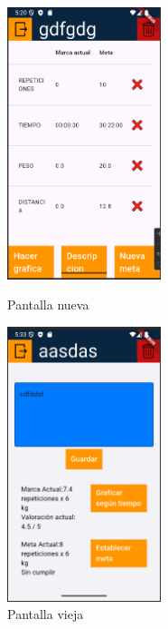 \begin{figure}[h!]
  \centering
  \includegraphics[width=0.4\textwidth]{fotos/ejerciciosNueva.png}
  \caption{Pantalla nueva}
  \includegraphics[width=0.4\textwidth]{fotos/ejerciciosVieja.png}
  \caption{Pantalla vieja}
  \label{fig:imagen}
\end{figure}

